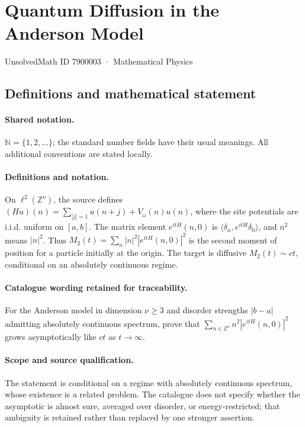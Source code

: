\documentclass[11pt]{article}
\begin{document}
\setcounter{section}{7900002}
\section{Quantum Diffusion in the Anderson Model}\label{7900003}
{\small UnsolvedMath ID 7900003 · Mathematical Physics}
\subsection{Definitions and mathematical statement}

\paragraph{Shared notation.}$\mathbb N=\{1,2,\ldots\}$; the standard number fields have their usual meanings. All additional conventions are stated locally.


\paragraph{Definitions and notation.}On $\ell^2(\mathbb Z^\nu)$, the source defines $(Hu)(n)=\sum_{|j|=1}u(n+j)+V_\omega(n)u(n)$, where the site potentials are i.i.d. uniform on $[a,b]$. The matrix element $e^{itH}(n,0)$ is $\langle\delta_n,e^{itH}\delta_0\rangle$, and $n^2$ means $|n|^2$. Thus $M_2(t)=\sum_n|n|^2|e^{itH}(n,0)|^2$ is the second moment of position for a particle initially at the origin. The target is diffusive $M_2(t)\sim ct$, conditional on an absolutely continuous regime.

\paragraph{Catalogue wording retained for traceability.}
For the Anderson model in dimension $\nu\geq3$ and disorder strengths $|b-a|$ admitting absolutely continuous spectrum, prove that $\sum_{n\in\mathbb Z^\nu} n^2|e^{itH}(n,0)|^2$ grows asymptotically like $ct$ as $t\to\infty$.
\paragraph{Scope and source qualification.}The statement is conditional on a regime with absolutely continuous spectrum, whose existence is a related problem. The catalogue does not specify whether the asymptotic is almost sure, averaged over disorder, or energy-restricted; that ambiguity is retained rather than replaced by one stronger assertion.
\end{document}
